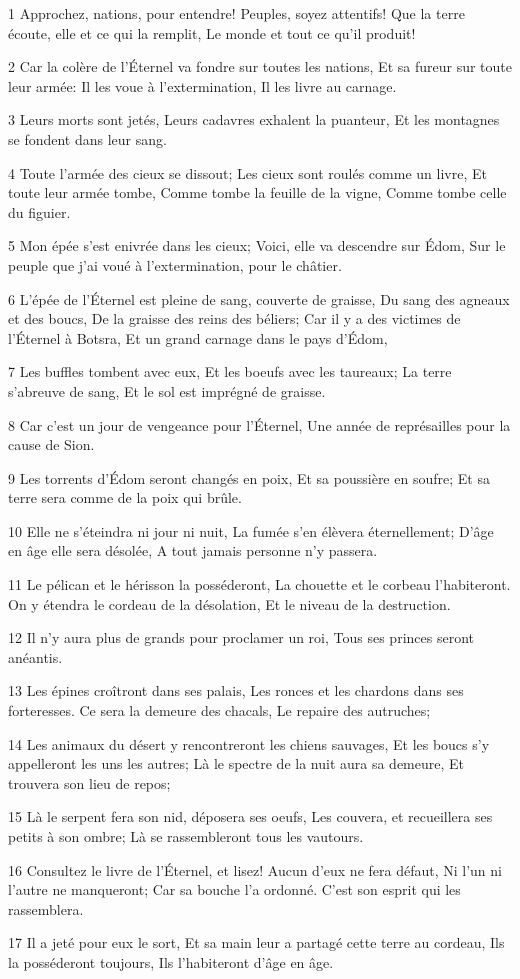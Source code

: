 \par 1 Approchez, nations, pour entendre! Peuples, soyez attentifs! Que la terre écoute, elle et ce qui la remplit, Le monde et tout ce qu'il produit!
\par 2 Car la colère de l'Éternel va fondre sur toutes les nations, Et sa fureur sur toute leur armée: Il les voue à l'extermination, Il les livre au carnage.
\par 3 Leurs morts sont jetés, Leurs cadavres exhalent la puanteur, Et les montagnes se fondent dans leur sang.
\par 4 Toute l'armée des cieux se dissout; Les cieux sont roulés comme un livre, Et toute leur armée tombe, Comme tombe la feuille de la vigne, Comme tombe celle du figuier.
\par 5 Mon épée s'est enivrée dans les cieux; Voici, elle va descendre sur Édom, Sur le peuple que j'ai voué à l'extermination, pour le châtier.
\par 6 L'épée de l'Éternel est pleine de sang, couverte de graisse, Du sang des agneaux et des boucs, De la graisse des reins des béliers; Car il y a des victimes de l'Éternel à Botsra, Et un grand carnage dans le pays d'Édom,
\par 7 Les buffles tombent avec eux, Et les boeufs avec les taureaux; La terre s'abreuve de sang, Et le sol est imprégné de graisse.
\par 8 Car c'est un jour de vengeance pour l'Éternel, Une année de représailles pour la cause de Sion.
\par 9 Les torrents d'Édom seront changés en poix, Et sa poussière en soufre; Et sa terre sera comme de la poix qui brûle.
\par 10 Elle ne s'éteindra ni jour ni nuit, La fumée s'en élèvera éternellement; D'âge en âge elle sera désolée, A tout jamais personne n'y passera.
\par 11 Le pélican et le hérisson la posséderont, La chouette et le corbeau l'habiteront. On y étendra le cordeau de la désolation, Et le niveau de la destruction.
\par 12 Il n'y aura plus de grands pour proclamer un roi, Tous ses princes seront anéantis.
\par 13 Les épines croîtront dans ses palais, Les ronces et les chardons dans ses forteresses. Ce sera la demeure des chacals, Le repaire des autruches;
\par 14 Les animaux du désert y rencontreront les chiens sauvages, Et les boucs s'y appelleront les uns les autres; Là le spectre de la nuit aura sa demeure, Et trouvera son lieu de repos;
\par 15 Là le serpent fera son nid, déposera ses oeufs, Les couvera, et recueillera ses petits à son ombre; Là se rassembleront tous les vautours.
\par 16 Consultez le livre de l'Éternel, et lisez! Aucun d'eux ne fera défaut, Ni l'un ni l'autre ne manqueront; Car sa bouche l'a ordonné. C'est son esprit qui les rassemblera.
\par 17 Il a jeté pour eux le sort, Et sa main leur a partagé cette terre au cordeau, Ils la posséderont toujours, Ils l'habiteront d'âge en âge.

